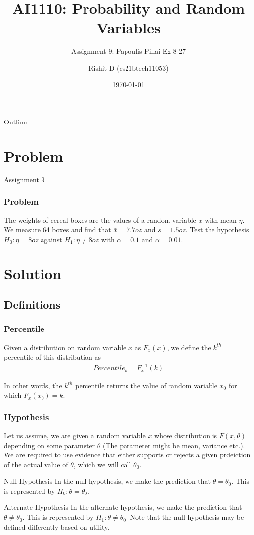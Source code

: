 \documentclass{beamer}
\title{AI1110: Probability and Random Variables}
\subtitle{Assignment 9: Papoulis-Pillai Ex 8-27}
\author{Rishit D (cs21btech11053)}
\institute{IIT Hyderabad}
\date{\today}
\begin{document}
\begin{frame}
	\titlepage 
\end{frame}

\begin{frame}{Outline}
	\tableofcontents
\end{frame}

\section{Problem}

\begin{frame}{Assignment 9}
	\frametitle{Problem}
	The weights of cereal boxes are the values of a random variable $x$ with mean $\eta$. We measure 64 boxes and find that $\bar{x} = 7.7 oz$ and $s = 1.5 oz$. Test the hypothesis $H_0 : \eta = 8 oz$ against $H_1 : \eta \neq 8 oz$ with $\alpha = 0.1$ and $\alpha = 0.01$.
\end{frame}

\section{Solution}

\subsection{Definitions}
\begin{frame}
	\frametitle{Percentile}
	Given a distribution on random variable $x$ as $F_x(x)$, we define the $k^{th}$ percentile of this distribution as
	\begin{align}
		Percentile_k = F_x^{-1}(k)
		\label{eq:Percentile}
	\end{align}

	In other words, the $k^{th}$ percentile returns the value of random variable $x_0$ for which $F_x(x_0) = k$.
\end{frame}

\begin{frame}
	\frametitle{Hypothesis}
	Let us assume, we are given a random variable $x$ whose distribution is $F(x, \theta)$ depending on some parameter $\theta$ (The parameter might be mean, variance etc.). We are required to use evidence that either supports or rejects a given prdeiction of the actual value of $\theta$, which we will call $\theta_0$.
	
	\begin{block}{Null Hypothesis}
		In the null hypothesis, we make the prediction that $\theta = \theta_0$. This is represented by $H_0 : \theta = \theta_0$.
	\end{block}
	
	\begin{block}{Alternate Hypothesis}
		In the alternate hypothesis, we make the prediction that $\theta \neq \theta_0$. This is represented by $H_1 : \theta \neq \theta_0$. Note that the null hypothesis may be defined differently based on utility.
	\end{block}	

\end{frame}
\end{document}

